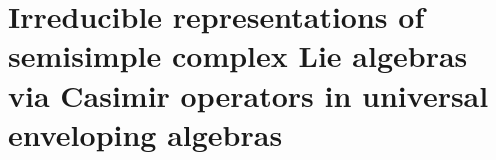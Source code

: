 

\chapter{Irreducible representations of semisimple complex Lie algebras via Casimir operators in universal enveloping algebras}
\setcounter{theorem}{0}
\setcounter{equation}{0}


\renewcommand{\theenumi}{\roman{enumi}}
\renewcommand{\labelenumi}{\textnormal{(\theenumi)}$\;\;$}


